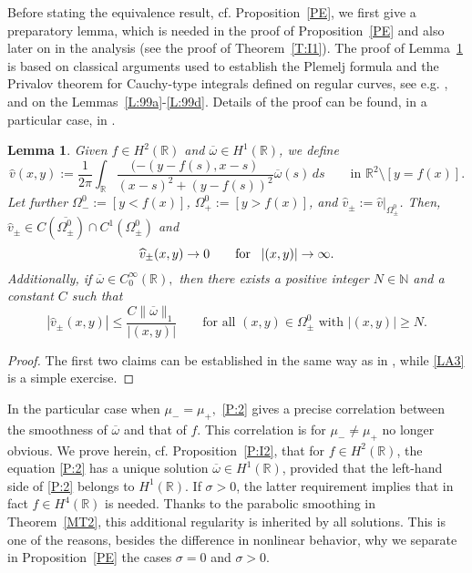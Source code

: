\documentclass[11pt,reqno]{amsart}
\numberwithin{equation}{section}
\newcommand{\0}{\Omega}
\newcommand{\ov}{\overline}
\newcommand{\wh}{\widehat}
\newcommand{\oo}{\ov\omega}
\newcommand{\R}{\mathbb{R}}
\newcommand{\N}{\mathbb{N}}
\newtheorem{lemma}[thm]{Lemma}
\numberwithin{equation}{section}
\begin{document}
Before stating the equivalence result, cf. Proposition~\ref{PE}, we first give a preparatory lemma, which is needed in the proof of Proposition~\ref{PE} and also later on in the analysis (see the proof of Theorem~\ref{T:I1}).
The proof of Lemma~\ref{L:A2} is based on classical arguments used to establish the  Plemelj formula and the Privalov theorem for  Cauchy-type integrals defined on regular curves, 
see e.g. \cite{JKL93}, and on the Lemmas~\ref{L:99a}-\ref{L:99d}.
Details of the proof  can be found, in a particular case, in \cite[Lemma~A.2.]{M16x}.  
\begin{lemma}\label{L:A2}Given $f\in H^2(\R)$ and $\ov\omega\in H^1(\R)$, we define
 \begin{equation}\label{V1'}
 \wh v(x,y):=\frac{1}{2\pi} \int_\R\frac{(-(y-f(s),x-s)}{ (x-s)^2+(y-f(s))^2 }\ov\omega(s)\, ds\qquad \text{in $\R^2\setminus[y=f(x)]$.}
\end{equation}
Let further  $\0_-^0:=[y<f(x)]$, $ \0_+^0:=[y>f(x)]$, and $\wh v_\pm:=\wh v\big|_{\0_\pm^0}$. Then,     $\wh v_\pm\in C (\ov{\0_\pm^0})\cap C^1({\0_\pm^0})$ and
 \begin{equation}\label{LA2}
\wh v_\pm(x,y)\to0 \qquad\text{for \, $|(x,y)|\to\infty$}.
\end{equation} 
Additionally, if $\ov\omega \in C^\infty_0(\R),$ then there exists a positive integer $N\in\N$  and a constant $C$ such that
 \begin{equation}\label{LA3}
|\wh v_\pm(x,y)|\leq\frac{ C\|\ov\omega\|_1}{|(x,y)|} \qquad\text{for all  $(x,y)\in\0_\pm^0$ with $|(x,y)|\geq N$}.
\end{equation}
\end{lemma}
\begin{proof}
 The first two claims can be established  in the same way as in \cite[Lemma~A.2]{M16x}, while \eqref{LA3} is a simple exercise.
\end{proof}

In the  particular case when  $\mu_-=\mu_+,$   \eqref{P:2} gives a precise correlation between the smoothness of  $\oo$ and that  of $f$. 
This  correlation is for $\mu_-\neq\mu_+$ no longer obvious.
We prove herein, cf. Proposition~\ref{P:I2}, that for $f\in H^2(\R)$, the equation \eqref{P:2} has a unique solution $\oo\in H^1(\R)$, provided that the left-hand side of \eqref{P:2} belongs to $H^1(\R)$. 
If $\sigma>0$, the latter requirement   implies that in fact $f\in H^4(\R)$ is needed. Thanks to the parabolic smoothing in Theorem~\ref{MT2}, this additional regularity is inherited by all solutions.  
This is one of the reasons, besides the difference in nonlinear behavior,  why we separate in Proposition~\ref{PE}   the cases   $\sigma=0$ and $\sigma>0$.
\end{document}
